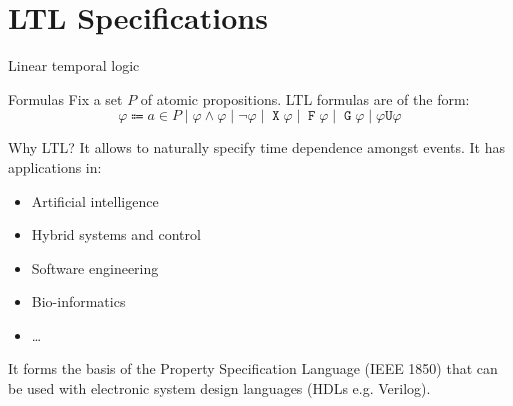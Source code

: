 \documentclass[aspectratio=169]{beamer}
\newcommand{\always}{\mathop{\mathtt{G}}}
\newcommand{\evtly}{\mathop{\mathtt{F}}}
\newcommand{\until}{\mathrel{\mathtt{U}}}
\newcommand{\nxt}{\mathop{\mathtt{X}}}
\begin{document}
\section{LTL Specifications}

\begin{frame}{Linear temporal logic}
  \begin{block}{Formulas}
    Fix a set $P$ of \alert{atomic propositions}. LTL formulas are of the
    form:
    \[
      \varphi \Coloneqq a \in P \mid \varphi \land \varphi \mid
      \lnot \varphi \mid \nxt \varphi \mid \evtly \varphi \mid
      \always \varphi \mid \varphi \until \varphi
    \]
  \end{block}

  \begin{block}{Why LTL?}
    It allows to naturally specify time dependence amongst events.
    It has applications in:
    \begin{itemize}
      \item Artificial intelligence
      \item Hybrid systems and control
      \item Software engineering
      \item Bio-informatics
      \item \dots
    \end{itemize}
    It forms the basis of the \alert{Property Specification Language} (IEEE
    1850) that can be used with electronic system design languages (HDLs e.g.
    Verilog).
  \end{block}
\end{frame}
\end{document}
